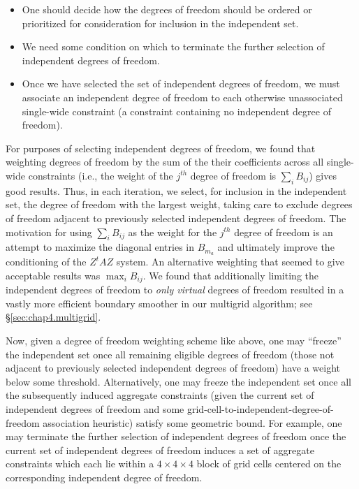 \begin{itemize}
\item One should decide how the degrees of freedom should be ordered or prioritized for consideration for inclusion in the independent set.
\item We need some condition on which to terminate the further selection of independent degrees of freedom.
\item Once we have selected the set of independent degrees of freedom, we must associate an independent degree of freedom to each otherwise unassociated single-wide constraint (a constraint containing no independent degree of freedom).
\end{itemize}

For purposes of selecting independent degrees of freedom, we found that weighting degrees of freedom by the sum of the their coefficients across all single-wide constraints (i.e., the weight of the $j^{th}$ degree of freedom is $\sum_i B_{ij}$) gives good results. Thus, in each iteration, we select, for inclusion in the independent set, the degree of freedom with the largest weight, taking care to exclude degrees of freedom adjacent to previously selected independent degrees of freedom. The motivation for using $\sum_i B_{ij}$ as the weight for the $j^{th}$ degree of freedom is an attempt to maximize the diagonal entries in $B_{m_a}$ and ultimately improve the conditioning of the $Z^tAZ$ system. An alternative weighting that seemed to give acceptable results was $\max_i B_{ij}$. We found that additionally limiting the independent degrees of freedom to \emph{only virtual} degrees of freedom resulted in a vastly more efficient boundary smoother in our multigrid algorithm; see \S\ref{sec:chap4.multigrid}.

Now, given a degree of freedom weighting scheme like above, one may ``freeze'' the independent set once all remaining eligible degrees of freedom (those not adjacent to previously selected independent degrees of freedom) have a weight below some threshold. Alternatively, one may freeze the independent set once all the subsequently induced aggregate constraints (given the current set of independent degrees of freedom and some grid-cell-to-independent-degree-of-freedom association heuristic) satisfy some geometric bound. For example, one may terminate the further selection of independent degrees of freedom once the current set of independent degrees of freedom induces a set of aggregate constraints which each lie within a $4 \times 4 \times 4$ block of grid cells centered on the corresponding independent degree of freedom.

